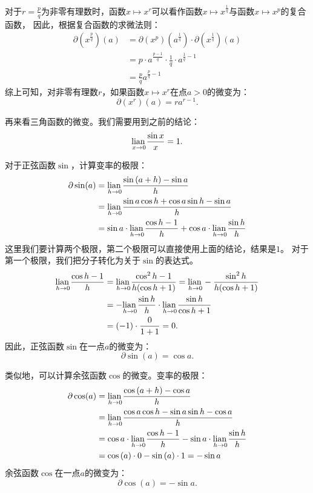 \documentclass[12pt,UTF8,fontset=none]{ctexbook}
\begin{document}
对于$r = \frac{p}{q}$为非零有理数时，函数$x \mapsto x^r$可以看作函数$x \mapsto x^{\frac{1}{q}}$与函数$x \mapsto x^{p}$的复合函数，
因此，根据复合函数的求微法则：
\begin{align*}
    \partial (x^{\frac{p}{q}}) (a) &= \partial (x^p) (a^{\frac{1}{q}}) \cdot \partial (x^{\frac{1}{q}}) (a)  \\
    &= p \cdot a^{\frac{p - 1}{q}} \cdot \frac{1}{q} \cdot a^{\frac{1}{q} - 1}  \\
    &= \frac{p}{q} a^{\frac{p}{q} - 1}     
\end{align*}
综上可知，对非零有理数$r$，如果函数$x \mapsto x^r$在点$a>0$的微变为：
$$ \partial (x^r) (a) = r a^{r-1}. $$

再来看三角函数的微变。我们需要用到之前的结论：
$$ \underset{x\to 0}{\operatorname{lian}\,} \frac{\sin{x}}{x} = 1.$$

对于正弦函数$\sin$，计算变率的极限：
\begin{align*}
    \partial \sin(a) &= \underset{h\to 0}{\operatorname{lian}\,} \frac{\sin{(a + h)} - \sin{a}}{h}  \\
    &= \underset{h\to 0}{\operatorname{lian}\,} \frac{\sin{a}\cos{h} + \cos{a}\sin{h} - \sin{a}}{h}  \\
    &= \sin{a} \cdot \underset{h\to 0}{\operatorname{lian}\,} \frac{\cos{h} - 1}{h} + \cos{a} \cdot \underset{h\to 0}{\operatorname{lian}\,}\frac{\sin{h}}{h} 
\end{align*}
这里我们要计算两个极限，第二个极限可以直接使用上面的结论，结果是$1$。
对于第一个极限，我们把分子转化为关于$\sin$的表达式。
\begin{align*}
    \underset{h\to 0}{\operatorname{lian}\,} \frac{\cos{h} - 1}{h} &= \underset{h\to 0}{\operatorname{lian}\,} \frac{\cos^2{h} - 1}{h(\cos{h} + 1)} = \underset{h\to 0}{\operatorname{lian}\,} -\frac{\sin^2{h}}{h(\cos{h} + 1)}  \\
    &= -\underset{h\to 0}{\operatorname{lian}\,} \frac{\sin{h}}{h} \cdot \underset{h\to 0}{\operatorname{lian}\,} \frac{\sin{h}}{\cos{h} + 1}  \\
    &= (-1) \cdot \frac{0}{1 + 1} = 0.  
\end{align*}
因此，正弦函数$\sin$在一点$a$的微变为：
$$ \partial \sin(a) = \cos{a}. $$

类似地，可以计算余弦函数$\cos$的微变。变率的极限：
\begin{align*}
    \partial \cos(a) &= \underset{h\to 0}{\operatorname{lian}\,} \frac{\cos{(a + h)} - \cos{a}}{h}  \\
    &= \underset{h\to 0}{\operatorname{lian}\,} \frac{\cos{a}\cos{h} - \sin{a}\sin{h} - \cos{a}}{h}  \\
    &= \cos{a} \cdot \underset{h\to 0}{\operatorname{lian}\,} \frac{\cos{h} - 1}{h} - \sin{a} \cdot\underset{h\to 0}{\operatorname{lian}\,}\frac{\sin{h}}{h}  \\
    &= \cos{(a)} \cdot 0 - \sin{(a)} \cdot 1 = -\sin{a} 
\end{align*}
余弦函数$\cos$在一点$a$的微变为：
$$ \partial \cos(a) = -\sin{a}. $$
\end{document}
